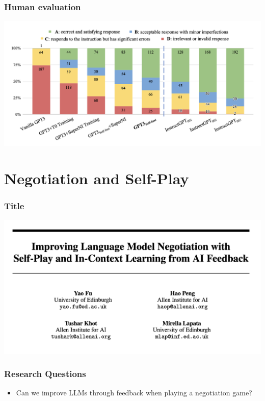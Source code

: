\documentclass[xcolor=dvipsnames]{beamer}
\newcommand{\0}{\vec{0}}
\begin{document}
\begin{frame}
	\frametitle{Human evaluation}
	\begin{center}
		\includegraphics[width=\textwidth]{Wang5}
	\end{center}
\end{frame}



\section{Negotiation and Self-Play}
\begin{frame}
	\frametitle{Title}
	\begin{center}
		\includegraphics[width=\textwidth]{Fu0}
	\end{center}
\end{frame}

\begin{frame}
	\frametitle{Research Questions
	}
	\begin{itemize}
		\item Can we improve LLMs through feedback when playing a negotiation game?
	\end{itemize}
\end{frame}
\end{document}
